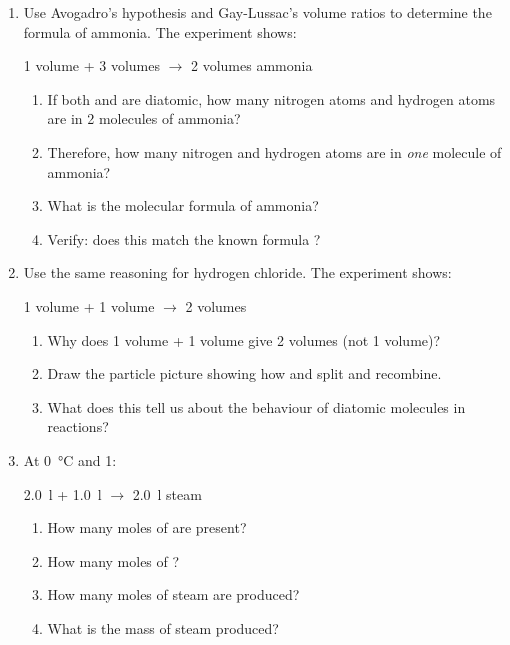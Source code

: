 \documentclass[12pt, a4paper]{book}
\theoremstyle{definition}
\begin{document}
\begin{problembox}
\begin{enumerate}[label=\textbf{\arabic*.}]
  \item Use Avogadro's hypothesis and Gay-Lussac's volume ratios
        to determine the formula of ammonia.
        The experiment shows:
        \begin{center}
        1 volume  + 3 volumes  $\rightarrow$
        2 volumes ammonia
        \end{center}
        \begin{enumerate}[label=(\alph*)]
          \item If both  and  are diatomic,
                how many nitrogen atoms and hydrogen atoms
                are in 2 molecules of ammonia?
          \item Therefore, how many nitrogen and hydrogen
                atoms are in \emph{one} molecule of ammonia?
          \item What is the molecular formula of ammonia?
          \item Verify: does this match the known formula ?
        \end{enumerate}

  \item Use the same reasoning for hydrogen chloride.
        The experiment shows:
        \begin{center}
        1 volume  + 1 volume  $\rightarrow$
        2 volumes 
        \end{center}
        \begin{enumerate}[label=(\alph*)]
          \item Why does 1 volume + 1 volume give 2 volumes
                (not 1 volume)?
          \item Draw the particle picture showing how
                 and  split and recombine.
          \item What does this tell us about the behaviour
                of diatomic molecules in reactions?
        \end{enumerate}

  \item At \SI{0}{\degreeCelsius} and \SI{1}{}:
        \begin{center}
        \SI{2.0}{\litre}  + \SI{1.0}{\litre} 
        $\rightarrow$ \SI{2.0}{\litre} steam
        \end{center}
        \begin{enumerate}[label=(\alph*)]
          \item How many moles of  are present?
          \item How many moles of ?
          \item How many moles of steam are produced?
          \item What is the mass of steam produced?
        \end{enumerate}
\end{enumerate}
\end{problembox}
\end{document}
